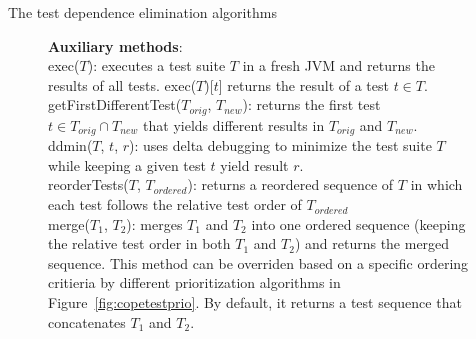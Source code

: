 The test dependence elimination algorithms

\begin{figure}[t!]
	\textbf{Auxiliary methods}: \\
    exec($\mathit{T}$): executes a test suite $T$ in a fresh JVM and returns the
    results of all tests. exec($\mathit{T}$)[$\mathit{t}$] returns the result of
    a test $\mathit{t} \in T$.\\
    getFirstDifferentTest($\mathit{T_{orig}}$, $\mathit{T_{new}}$): returns the first
    test $\mathit{t} \in \mathit{T_{orig}} \cap \mathit{T_{new}}$ that yields
    different results in $\mathit{T_{orig}}$ and $\mathit{T_{new}}$.\\
    ddmin($\mathit{T}$, $\mathit{t}$, $\mathit{r}$): uses delta debugging to minimize
    the test suite $\mathit{T}$ while keeping a given test $\mathit{t}$ yield result $\mathit{r}$. \\
    reorderTests($\mathit{T}$, $\mathit{T_{ordered}}$): returns a reordered sequence of $\mathit{T}$ in which each test follows the relative test order of $\mathit{T_{ordered}}$\\
    merge($\mathit{T_1}$, $\mathit{T_2}$): merges
    $\mathit{T_1}$ and $\mathit{T_2}$ into one ordered sequence (keeping
    the relative test order in both $\mathit{T_1}$ and $\mathit{T_2}$)
    and returns the merged sequence.
    This method can be overriden based on a specific ordering critieria 
    by different prioritization algorithms in Figure~\ref{fig:copetestprio}.
        By default, it returns a test sequence
    that concatenates $\mathit{T_1}$ and $\mathit{T_2}$.\\


\end{figure}
